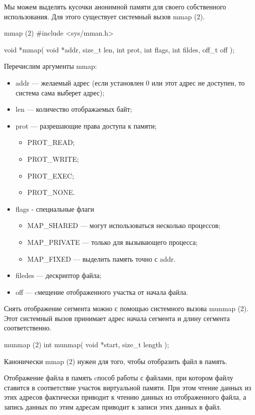 Мы можем выделять кусочки анонимной памяти для своего собственного использования. Для этого существует системный вызов mmap (2).

\begin{CCode}{mmap (2)}
	#include <sys/mman.h>

	void *mmap(
		void *addr, 
		size_t len, 
		int prot, 
		int flags, 
		int fildes, 
		off_t off
	); \end{CCode}

Перечислим аргументы mmap:

\begin{itemize}
	\item addr --- желаемый адрес (если установлен 0 или этот адрес не доступен, то система сама выберет адрес);
	\item len  --- количество отображаемых байт;
	\item prot --- разрешающие права доступа к памяти;
		\begin{itemize}
			\item PROT\_READ;
			\item PROT\_WRITE;
			\item PROT\_EXEC;
			\item PROT\_NONE.
		\end{itemize}
	\item flags - специальные флаги
		\begin{itemize}
			\item MAP\_SHARED --- могут использоваться несколько процессов;
			\item MAP\_PRIVATE --- только для вызывающего процесса;
			\item MAP\_FIXED --- выделить память точно с addr.
		\end{itemize}
	\item filedes --- дескриптор файла;
	\item off --- cмещение отображенного участка от начала файла.	
\end{itemize}

Снять отображение сегмента  можно с помощью системного вызова munmap (2). Этот системный вызов принимает адрес начала сегмента и длину сегмента соответственно. 

\begin{CCode}{munmap (2)}
	int munmap(
		void *start, 
		size_t length
	); \end{CCode}

\begin{important}
	Канонически mmap (2) нужен для того, чтобы отобразить файл в память.

	\begin{defi}{Отображение файла в память}
		cпособ работы с файлами, при котором файлу ставится в соответствие участок виртуальной памяти. При этом чтение данных из этих адресов фактически приводит к чтению данных из отображенного файла, а запись данных по этим адресам приводит к записи этих данных в файл.
	\end{defi}

\end{important}